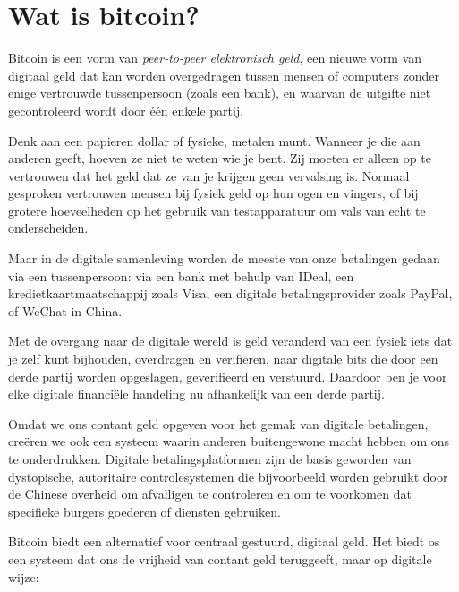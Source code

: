 \chapter{Wat is bitcoin?}

Bitcoin is een vorm van \textit{peer-to-peer elektronisch geld}, een nieuwe vorm van digitaal geld dat kan worden overgedragen tussen mensen of computers zonder enige vertrouwde tussenpersoon (zoals een bank), en waarvan de uitgifte niet gecontroleerd wordt door één enkele partij. 

Denk aan een papieren dollar of fysieke, metalen munt. Wanneer je die aan anderen geeft, hoeven ze niet te weten wie je bent. Zij moeten er alleen op te vertrouwen dat het geld dat ze van je krijgen geen vervalsing is. Normaal gesproken vertrouwen mensen bij fysiek geld op hun ogen en vingers, of bij grotere hoeveelheden op het gebruik van testapparatuur om vals van echt te onderscheiden.

Maar in de digitale samenleving worden de meeste van onze betalingen gedaan via een tussenpersoon: via een bank met behulp van IDeal, een kredietkaartmaatschappij zoals Visa, een digitale betalingsprovider zoals PayPal, of WeChat in China.

Met de overgang naar de digitale wereld is geld veranderd van een fysiek iets dat je zelf kunt bijhouden, overdragen en verifiëren, naar digitale bits die door een derde partij worden opgeslagen, geverifieerd en verstuurd. Daardoor ben je voor elke digitale financiële handeling nu afhankelijk van een derde partij. 

Omdat we ons contant geld opgeven voor het gemak van digitale betalingen, creëren we ook een systeem waarin anderen buitengewone macht hebben om ons te onderdrukken. Digitale betalingsplatformen zijn de basis geworden van dystopische, autoritaire controlesystemen die bijvoorbeeld worden gebruikt door de Chinese overheid om afvalligen te controleren en om te voorkomen dat specifieke burgers goederen of diensten gebruiken. 

Bitcoin biedt een alternatief voor centraal gestuurd, digitaal geld. Het biedt os een systeem dat ons de vrijheid van contant geld teruggeeft, maar op digitale wijze: 

